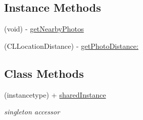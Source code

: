 \subsection*{Instance Methods}
\begin{DoxyCompactItemize}
\item 
(void) -\/ \hyperlink{interface_cerca_pix_controller_a8fa1a5697e86cda32523f0d848b3078a}{get\-Nearby\-Photos}
\item 
(C\-L\-Location\-Distance) -\/ \hyperlink{interface_cerca_pix_controller_aaba69007e8987252df1bdbb1894d18f0}{get\-Photo\-Distance\-:}
\end{DoxyCompactItemize}
\subsection*{Class Methods}
\begin{DoxyCompactItemize}
\item 
\hypertarget{interface_cerca_pix_controller_aca9f6a1b57e6833eed9fb1461e81a777}{(instancetype) + \hyperlink{interface_cerca_pix_controller_aca9f6a1b57e6833eed9fb1461e81a777}{shared\-Instance}}\label{interface_cerca_pix_controller_aca9f6a1b57e6833eed9fb1461e81a777}

\begin{DoxyCompactList}\small\item\em singleton accessor \end{DoxyCompactList}\end{DoxyCompactItemize}
